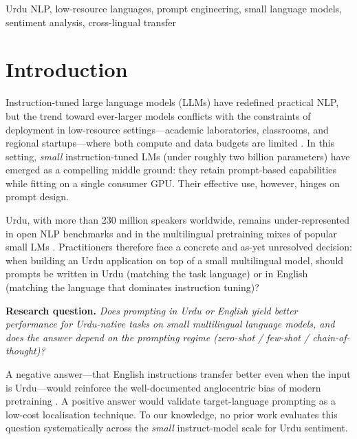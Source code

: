 \documentclass[conference]{IEEEtran}
\begin{document}
\begin{IEEEkeywords}
Urdu NLP, low-resource languages, prompt engineering, small language models,
sentiment analysis, cross-lingual transfer
\end{IEEEkeywords}

\section{Introduction}

Instruction-tuned large language models (LLMs) have redefined practical NLP,
but the trend toward ever-larger models conflicts with the constraints of
deployment in low-resource settings---academic laboratories, classrooms, and
regional startups---where both compute and data budgets are limited
\cite{qwen25}. In this setting, \emph{small} instruction-tuned
LMs (under roughly two billion parameters) have emerged as a compelling
middle ground: they retain prompt-based capabilities while fitting on a
single consumer GPU. Their effective use, however, hinges on prompt design.

Urdu, with more than 230 million speakers worldwide, remains under-represented
in open NLP benchmarks and in the multilingual pretraining mixes of popular
small LMs \cite{joshi2020state,urdusurvey2023}. Practitioners therefore face
a concrete and as-yet unresolved decision: when building an Urdu application
on top of a small multilingual model, should prompts be written in Urdu
(matching the task language) or in English (matching the language that
dominates instruction tuning)?

\textbf{Research question.} \emph{Does prompting in Urdu or English yield
better performance for Urdu-native tasks on small multilingual language
models, and does the answer depend on the prompting regime
(zero-shot / few-shot / chain-of-thought)?}

A negative answer---that English instructions transfer better even when the
input is Urdu---would reinforce the well-documented anglocentric bias of
modern pretraining \cite{ahuja2023mega,lai2023chatgpt}. A positive answer
would validate target-language prompting as a low-cost localisation
technique. To our knowledge, no prior work evaluates this question
systematically across the \emph{small} instruct-model scale for Urdu
sentiment.
\end{document}
